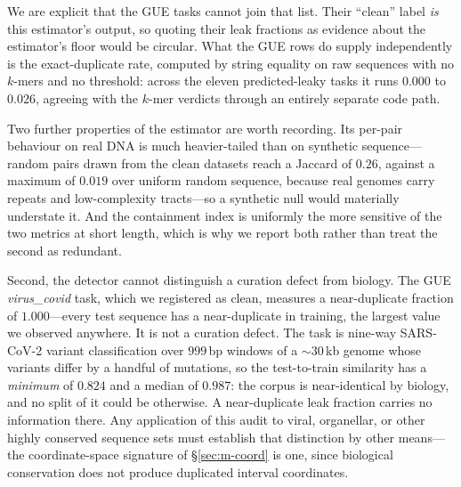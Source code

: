 \documentclass[webpdf,modern,large,namedate]{oup-authoring-template}%
\begin{document}
We are explicit that the GUE tasks cannot join that list. Their ``clean'' label \emph{is} this estimator's output, so quoting their leak fractions as evidence about the estimator's floor would be circular. What the GUE rows do supply independently is the exact-duplicate rate, computed by string equality on raw sequences with no $k$-mers and no threshold: across the eleven predicted-leaky tasks it runs $0.000$ to $0.026$, agreeing with the $k$-mer verdicts through an entirely separate code path.

Two further properties of the estimator are worth recording. Its per-pair behaviour on real DNA is much heavier-tailed than on synthetic sequence---random pairs drawn from the clean datasets reach a Jaccard of $0.26$, against a maximum of $0.019$ over uniform random sequence, because real genomes carry repeats and low-complexity tracts---so a synthetic null would materially understate it. And the containment index is uniformly the more sensitive of the two metrics at short length, which is why we report both rather than treat the second as redundant.

Second, the detector cannot distinguish a curation defect from biology. The GUE \textit{virus\_covid} task, which we registered as clean, measures a near-duplicate fraction of $1.000$---every test sequence has a near-duplicate in training, the largest value we observed anywhere. It is not a curation defect. The task is nine-way SARS-CoV-2 variant classification over $999$\,bp windows of a ${\sim}30$\,kb genome whose variants differ by a handful of mutations, so the test-to-train similarity has a \emph{minimum} of $0.824$ and a median of $0.987$: the corpus is near-identical by biology, and no split of it could be otherwise. A near-duplicate leak fraction carries no information there. Any application of this audit to viral, organellar, or other highly conserved sequence sets must establish that distinction by other means---the coordinate-space signature of \S\ref{sec:m-coord} is one, since biological conservation does not produce duplicated interval coordinates.
\end{document}

